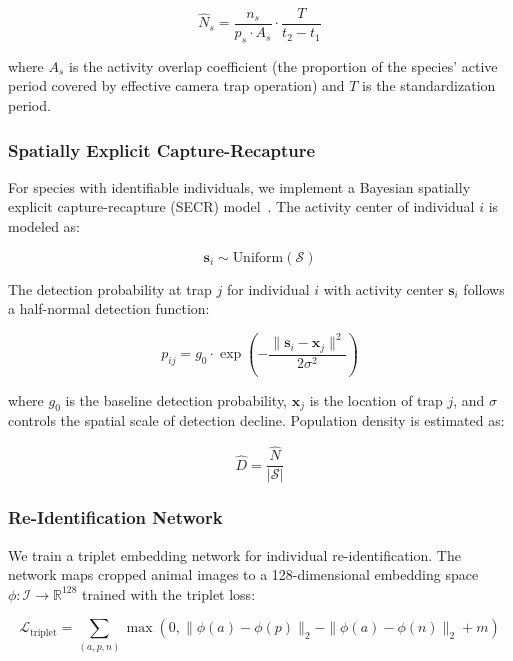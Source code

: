 \documentclass[11pt,letterpaper]{article}
\begin{document}
\begin{equation}
\hat{N}_s = \frac{n_s}{p_s \cdot A_s} \cdot \frac{T}{t_2 - t_1}
\end{equation}

where $A_s$ is the activity overlap coefficient (the proportion of the species' active period covered by effective camera trap operation) and $T$ is the standardization period.

\subsubsection{Spatially Explicit Capture-Recapture}

For species with identifiable individuals, we implement a Bayesian spatially explicit capture-recapture (SECR) model~\cite{efford2004}. The activity center of individual $i$ is modeled as:

\begin{equation}
\mathbf{s}_i \sim \text{Uniform}(\mathcal{S})
\end{equation}

The detection probability at trap $j$ for individual $i$ with activity center $\mathbf{s}_i$ follows a half-normal detection function:

\begin{equation}
p_{ij} = g_0 \cdot \exp\left(-\frac{\|\mathbf{s}_i - \mathbf{x}_j\|^2}{2\sigma^2}\right)
\end{equation}

where $g_0$ is the baseline detection probability, $\mathbf{x}_j$ is the location of trap $j$, and $\sigma$ controls the spatial scale of detection decline. Population density is estimated as:

\begin{equation}
\hat{D} = \frac{\hat{N}}{|\mathcal{S}|}
\end{equation}

\subsubsection{Re-Identification Network}

We train a triplet embedding network for individual re-identification. The network maps cropped animal images to a 128-dimensional embedding space $\phi: \mathcal{I} \to \mathbb{R}^{128}$ trained with the triplet loss:

\begin{equation}
\mathcal{L}_{\text{triplet}} = \sum_{(a,p,n)} \max\left(0, \|\phi(a) - \phi(p)\|_2 - \|\phi(a) - \phi(n)\|_2 + m\right)
\end{equation}
\end{document}

